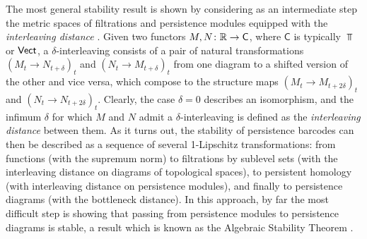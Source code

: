 The most general stability result is shown by considering as an intermediate step the metric spaces of filtrations and persistence modules equipped with the \emph{interleaving distance} \cite{MR2279866}.
Given two functors $M,N \colon \mathbb{R} \to \mathsf C$, where $\mathsf C$ is typically $\Top$ or $\mathsf{Vect}$, a $\delta$-interleaving consists of a pair of natural transformations $(M_t \to N_{t+\delta})_t$ and $(N_t \to M_{t+\delta})_t$ from one diagram to a shifted version of the other and vice versa, which compose to the structure maps $(M_t \to M_{t+2\delta})_t$ and $(N_t \to N_{t+2\delta})_t$.
Clearly, the case $\delta=0$ describes an isomorphism, and the infimum $\delta$ for which $M$ and $N$ admit a $\delta$-interleaving is defined as the \emph{interleaving distance} between them.
As it turns out, the stability of persistence barcodes can then be described as a sequence of several 1-Lipschitz transformations: from functions (with the supremum norm) to filtrations by sublevel sets (with the interleaving distance on diagrams of topological spaces), to persistent homology (with interleaving distance on persistence modules), and finally to persistence diagrams (with the bottleneck distance).
In this approach, by far the most difficult step is showing that passing from persistence modules to persistence diagrams is stable, a result which is known as the Algebraic Stability Theorem  \cite{10.1145/1542362.1542407,Chazal.2016a,MR3333456}.
